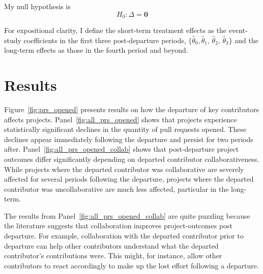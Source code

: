\documentclass[12pt,notitlepage]{article}
\begin{document}
My null hypothesis is \[
H_0: \Delta = \mathbf{0}
\]

For expositional clarity, I define the short‐term treatment effects as the event‐study coefficients in the first three post‐departure periods,
$\{\hat\theta_{0},\hat\theta_{1},\,\hat\theta_{2},\,\hat\theta_{3}\}$ 
and the long-term effects as those in the fourth period and beyond. 



\section{Results} \label{sec:result}

Figure~\ref{fig:prs_opened} presents results on how the departure of key contributors affects projects. Panel~\ref{fig:all_prs_opened} shows that projects experience statistically significant declines in the quantity of pull requests opened. These declines appear immediately following the departure and persist for two periods after.  Panel~\ref{fig:all_prs_opened_collab} shows that post-departure project outcomes differ significantly depending on departed contributor collaborativeness. While projects where the departed contributor was collaborative are severely affected for several periods following the departure, projects where the departed contributor was uncollaborative are much less affected, particular in the long-term. 

The results from Panel~\ref{fig:all_prs_opened_collab} are quite puzzling because the literature suggests that collaboration improves project-outcomes post departure.   For example, collaboration with the departed contributor prior to departure can help other contributors understand what the departed contributor's contributions were. This might, for instance, allow other contributors to react accordingly to make up the lost effort following a departure. 
\end{document}
